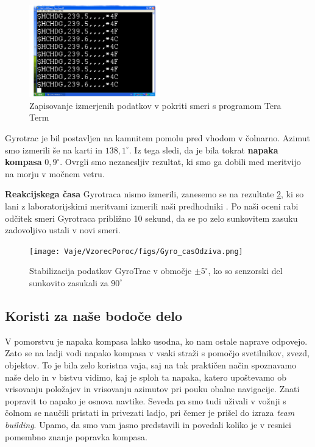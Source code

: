 \begin{figure}
	\centering
	\includegraphics[height=4cm]{Vaje/VzorecPoroc/figs/TT_zapisovanje.pdf}
	\caption{Zapisovanje izmerjenih podatkov v pokriti smeri s programom Tera Term}
	\label{fig:TT_zapisovanjePokriteSmeri}       %
\end{figure}

Gyrotrac je bil postavljen na kamnitem pomolu pred vhodom v čolnarno. Azimut smo izmerili še na karti in $138,1^{\circ}$. Iz tega sledi, da je bila tokrat \textbf{napaka kompasa} $0,9^{\circ}$. Ovrgli smo nezanesljiv rezultat, ki smo ga dobili med meritvijo na morju v močnem vetru. 

\textbf{Reakcijskega časa} Gyrotraca nismo izmerili, zanesemo se na rezultate \ref{fig:StabRez}, ki so lani z laboratorijskimi meritvami izmerili naši predhodniki \cite{Girokompas_2013}. Po naši oceni rabi odčitek smeri Gyrotraca približno 10 sekund, da se po zelo sunkovitem zasuku zadovoljivo ustali v novi smeri.

\begin{figure}
	\centering
	\texttt{[image: Vaje/VzorecPoroc/figs/Gyro\_casOdziva.png]}
	\caption{Stabilizacija podatkov GyroTrac v območje $\pm5^{\circ}$, ko so senzorski del sunkovito zasukali za $90^{\circ}$  \cite{Girokompas_2013}}
	\label{fig:StabRez}       %
\end{figure} 


\subsection{Koristi za naše bodoče delo}
\label{sec:2}
V pomorstvu je napaka kompasa lahko usodna,  ko nam ostale naprave odpovejo. Zato se na ladji vodi napako kompasa v vsaki straži s pomočjo svetilnikov, zvezd, objektov. To je bila zelo koristna vaja, saj na tak praktičen način spoznavamo naše delo in v bistvu vidimo, kaj je sploh ta napaka, katero upoštevamo ob vrisovanju položajev in vrisovanju azimutov pri pouku obalne navigacije. Znati popravit to napako je osnova navtike. Seveda pa smo tudi uživali v vožnji s čolnom se naučili pristati in privezati ladjo, pri čemer je prišel do izraza \textit{team building}. Upamo, da smo vam jasno predstavili in povedali koliko je v resnici pomembno znanje popravka kompasa.


%
%

%
